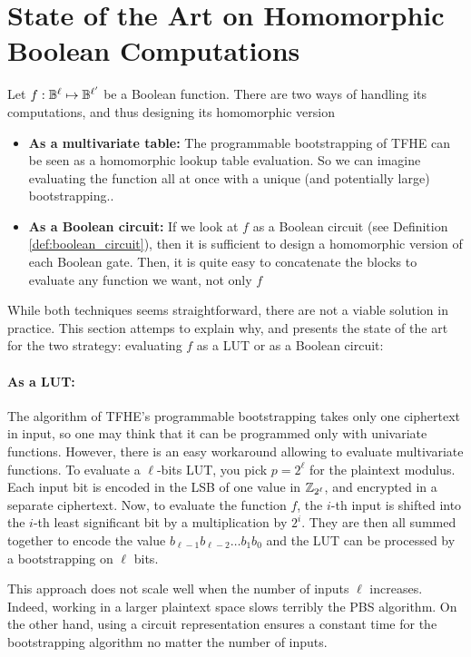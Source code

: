 \section{State of the Art on Homomorphic Boolean Computations}


Let $f : \mathbb{B}^\ell \mapsto \mathbb{B}^{\ell'}$ be a Boolean function. There are two ways of handling its computations, and thus designing its homomorphic version

\begin{itemize}
	\item \textbf{As a multivariate table: } The programmable bootstrapping of TFHE can be seen as a homomorphic lookup table evaluation. So we can imagine evaluating the function all at once with a unique (and potentially large) bootstrapping..
	\item \textbf{As a Boolean circuit: } If we look at $f$ as a Boolean circuit (see Definition \ref{def:boolean_circuit}), then it is sufficient to design a homomorphic version of each Boolean gate. Then, it is quite easy to concatenate the blocks to evaluate any function we want, not only $f$
\end{itemize}


While both techniques seems straightforward, there are not a viable solution in practice. This section attemps to explain why, and presents the state of the art for the two strategy: evaluating $f$ as a LUT or as a Boolean circuit:


\paragraph{As a LUT:}


The algorithm of TFHE's programmable bootstrapping takes only one ciphertext in input, so one may think that it can be programmed only with univariate functions. However, there is an easy workaround allowing to evaluate multivariate functions.
To evaluate a $\ell$-bits LUT, you pick $p = 2^\ell$ for the plaintext modulus. Each input bit is encoded in the LSB of one value in $\mathbb{Z}_{2^\ell}$, and encrypted in a separate ciphertext. Now, to evaluate the function $f$, the $i$-th input is shifted into the $i$-th least significant bit by a multiplication by $2^i$. They are then all summed together to encode the value $b_{\ell-1}b_{\ell-2}\dots b_1b_0$ and the LUT can be processed by a bootstrapping on $\ell$ bits.


This approach does not scale well when the number of inputs $\ell$ increases. Indeed, working in a larger plaintext space slows terribly the PBS algorithm. On the other hand, using a circuit representation ensures a constant time for the bootstrapping algorithm no matter the number of inputs. 


